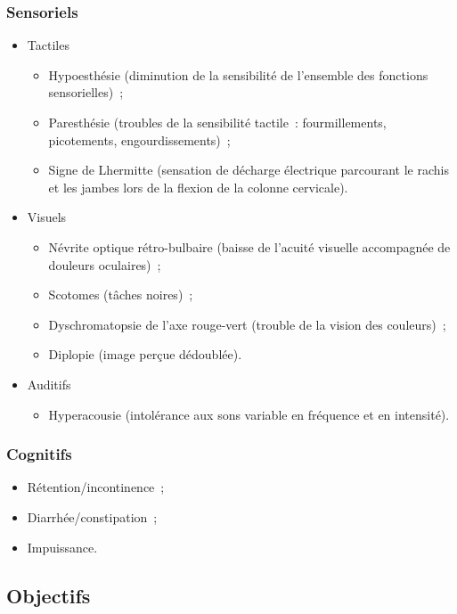 \documentclass[a4paper,12pt,francais]{article}
\begin{document}
\subsubsection{Sensoriels}
\begin{itemize}
    \item Tactiles
        \begin{itemize}
            \item Hypoesthésie (diminution de la sensibilité de l'ensemble des fonctions sensorielles)~;
            \item Paresthésie (troubles de la sensibilité tactile~: fourmillements, picotements, engourdissements)~;
            \item Signe de Lhermitte (sensation de décharge électrique parcourant le rachis et les jambes lors de la flexion de la colonne cervicale).
        \end{itemize}
    \item Visuels
        \begin{itemize}
            \item Névrite optique rétro-bulbaire (baisse de l'acuité visuelle accompagnée de douleurs oculaires)~;
            \item Scotomes (tâches noires)~;
            \item Dyschromatopsie de l’axe rouge-vert (trouble de la vision des couleurs)~;
            \item Diplopie (image perçue dédoublée).
        \end{itemize}
    \item Auditifs
        \begin{itemize}
            \item Hyperacousie (intolérance aux sons variable en fréquence et en intensité).
        \end{itemize}
\end{itemize}
\subsubsection{Cognitifs}
\begin{itemize}
    \item Rétention/incontinence~;
    \item Diarrhée/constipation~;
    \item Impuissance.
\end{itemize}

\subsection{Objectifs} %
\end{document}
